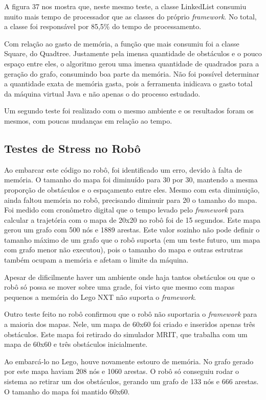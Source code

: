 A figura 37 nos mostra que, neste mesmo teste, a classe LinkedList consumiu muito mais tempo de processador que as classes do próprio \textit{framework}. No total, a classe foi responsável por 85,5\% do tempo de processamento.

Com relação ao gasto de memória, a função que mais consumiu foi a classe Square, do Quadtree. Justamente pela imensa quantidade de obstáculos e o pouco espaço entre eles, o algoritmo gerou uma imensa quantidade de quadrados para a geração do grafo, consumindo boa parte da memória. Não foi possível determinar a quantidade exata de memória gasta, pois a ferramenta inidicava o gasto total da máquina virtual Java e não apenas o do processo estudado.

Um segundo teste foi realizado com o mesmo ambiente e os resultados foram os mesmos, com poucas mudanças em relação ao tempo.

\subsection{Testes de Stress no Robô}

Ao embarcar este código no robô, foi identificado um erro, devido à falta de memória. O tamanho do mapa foi diminuído para 30 por 30, mantendo a mesma proporção de obstáculos e o espaçamento entre eles. Mesmo com esta diminuição, ainda faltou memória no robô, precisando diminuir para 20 o tamanho do mapa. Foi medido com cronômetro digital que o tempo levado pelo \textit{framework} para calcular a trajetória com o mapa de 20x20 no robô foi de 15 segundos. Este mapa gerou um grafo com 500 nós e 1889 arestas. Este valor sozinho não pode definir o tamanho máximo de um grafo que o robô suporta (em um teste futuro, um mapa com grafo menor não executou), pois o tamanho do mapa e outras estrutras também ocupam a memória e afetam o limite da máquina.

Apesar de dificilmente haver um ambiente onde haja tantos obstáculos ou que o robô só possa se mover sobre uma grade, foi visto que mesmo com mapas pequenos a memória do Lego NXT não suporta o \textit{framework}. 

Outro teste feito no robô confirmou que o robô não suportaria o \textit{framework} para a maioria dos mapas. Nele, um mapa de 60x60 foi criado e inseridos apenas três obstáculos. Este mapa foi retirado do simulador MRIT, que trabalha com um mapa de 60x60 e três obstáculos inicialmente. 

Ao embarcá-lo no Lego, houve novamente estouro de memória. No grafo gerado por este mapa haviam 208 nós e 1060 arestas. O robô só conseguiu rodar o sistema ao retirar um dos obstáculos, gerando um grafo de 133 nós e 666 arestas. O tamanho do mapa foi mantido 60x60.

